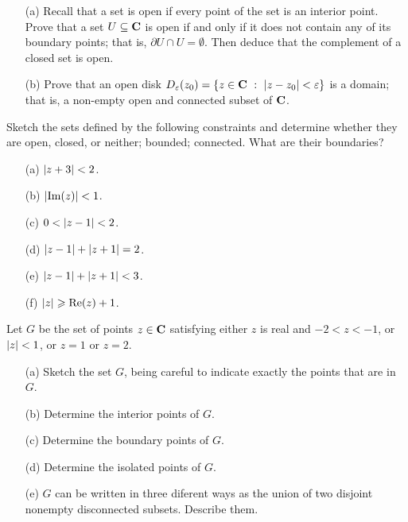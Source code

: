 \begin{problem}\label{prob 4.1}\hfill
\begin{itemize}
\item[(a)] Recall that a set is open if every point of the set is an interior point. Prove that a set $U \subseteq \mathbf C$ is open if and only if it does not contain any of its boundary points; that is, $\partial U \cap U = \emptyset$. Then deduce that the complement of a closed set is open.
\item[(b)] Prove that an open disk $D_\varepsilon(z_0) = \left\{z \in \mathbf C\ :\ \left\lvert z - z_0\right\rvert < \varepsilon\right\}$ is a domain; that is, a non-empty open and connected subset of $\mathbf C$.
\end{itemize}
\end{problem}

\vspace{0.1in}

\begin{problem}\label{prob 4.2}
Sketch the sets defined by the following constraints and determine whether they are open, closed, or neither; bounded; connected. What are their boundaries?
\begin{multicols}{2}
\begin{itemize}
\item[(a)] $\left\lvert z + 3\right\rvert < 2$.
\item[(b)] $\left\lvert\operatorname{Im}(z)\right\rvert < 1$.
\item[(c)] $0 < \left\lvert z - 1\right\rvert < 2$.
\item[(d)] $\left\lvert z - 1\right\rvert + \left\lvert z + 1\right\rvert = 2$.
\item[(e)] $\left\lvert z - 1\right\rvert + \left\lvert z + 1\right\rvert < 3$.
\item[(f)] $\left\lvert z\right\rvert \geqslant \operatorname{Re}(z) + 1$.
\end{itemize}
\end{multicols}
\end{problem}

\vspace{0.1in}

\begin{problem}\label{prob 4.3}
Let $G$ be the set of points $z \in \mathbf C$ satisfying either $z$ is real and $-2 < z < -1$, or $\left\lvert z\right\rvert < 1$, or $z = 1$ or $z = 2$.
\begin{itemize}
\item[(a)] Sketch the set $G$, being careful to indicate exactly the points that are in $G$.
\item[(b)] Determine the interior points of $G$.
\item[(c)] Determine the boundary points of $G$.
\item[(d)] Determine the isolated points of $G$.
\item[(e)] $G$ can be written in three diferent ways as the union of two disjoint nonempty disconnected subsets. Describe them.
\end{itemize}
\end{problem}

